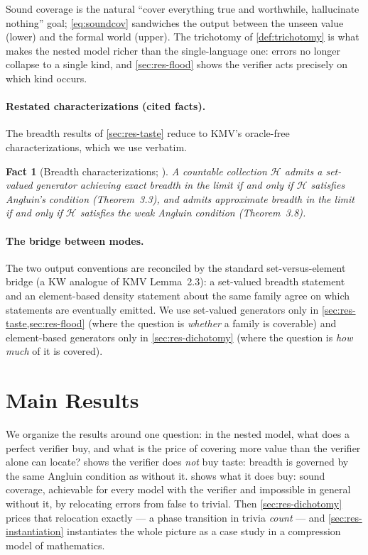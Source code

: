 \documentclass[11pt]{article}
\numberwithin{equation}{section}
\newcommand{\mc}[1]{\mathcal{#1}}
\newcommand{\Hcal}{\mc{H}}
\theoremstyle{plain}
\newtheorem{fact}[theorem]{Fact}
\theoremstyle{definition}
\theoremstyle{remark}
\begin{document}
Sound coverage is the natural ``cover everything true and worthwhile, hallucinate nothing''
goal; \eqref{eq:soundcov} sandwiches the output between the unseen value (lower) and the
formal world (upper). The trichotomy of \cref{def:trichotomy} is what makes the nested model
richer than the single-language one: errors no longer collapse to a single kind, and
\cref{sec:res-flood} shows the verifier acts precisely on which kind occurs.

\paragraph{Restated characterizations (cited facts).}
The breadth results of \cref{sec:res-taste} reduce to KMV's oracle-free characterizations,
which we use verbatim.

\begin{fact}[Breadth characterizations; {\citep[Theorems~3.3 and 3.8]{kalavasis2024characterizations}}]\label{fact:kmv}
A countable collection $\Hcal$ admits a set-valued
generator achieving exact breadth in the limit if and only if $\Hcal$ satisfies Angluin's
condition (Theorem~3.3), and admits approximate breadth in the limit if and only if $\Hcal$
satisfies the weak Angluin condition (Theorem~3.8).
\end{fact}

\paragraph{The bridge between modes.}
The two output conventions are reconciled by the standard set-versus-element bridge (a KW
analogue of KMV Lemma~2.3): a set-valued breadth statement and an element-based density
statement about the same family agree on which statements are eventually emitted. We use
set-valued generators only in \cref{sec:res-taste,sec:res-flood} (where the question is
\emph{whether} a family is coverable) and element-based generators only in
\cref{sec:res-dichotomy} (where the question is \emph{how much} of it is covered).

\section{Main Results}
\label{sec:results}

We organize the results around one question: in the nested model, what does a perfect verifier
buy, and what is the price of covering more value than the verifier alone can locate?
 shows the verifier does \emph{not} buy taste: breadth is governed by the
same Angluin condition as without it.  shows what it does buy: sound
coverage, achievable for every model with the verifier and impossible in general without it,
by relocating errors from false to trivial. Then \cref{sec:res-dichotomy} prices that
relocation exactly --- a phase transition in trivia \emph{count} --- and
\cref{sec:res-instantiation} instantiates the whole picture as a case study in a compression
model of mathematics.
\end{document}
